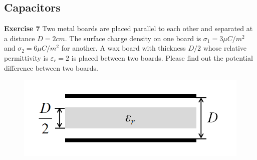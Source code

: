 \documentclass{beamer}
\begin{document}

\subsection{\bf Capacitors}

\begin{frame}{\bf Exercise 7}
    Two metal boards are placed parallel to each other and 
    separated at a distance $D=2cm$. The surface charge density 
    on one board is $\sigma_{1}=3\mu C/m^2$ and $\sigma_{2}=6\mu C/m^2$ 
    for another. A wax board with thickness $D/2$ whose relative 
    permittivity is $\varepsilon_{r}=2$ is placed between two boards. 
    Please find out the potential difference between two boards.
\begin{figure}
    \centering
    \includegraphics[scale=0.6]{images/013.png}
\end{figure} 

\end{frame}
\end{document}

